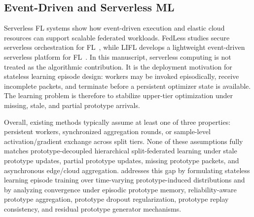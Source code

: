 \subsection{Event-Driven and Serverless ML}
Serverless FL systems show how event-driven execution and elastic cloud resources can support scalable federated workloads. FedLess studies secure serverless orchestration for FL~\cite{grafberger2021fedless}, while LIFL develops a lightweight event-driven serverless platform for FL~\cite{qi2024lifl}. In this manuscript, serverless computing is not treated as the algorithmic contribution. It is the deployment motivation for stateless learning episode design: workers may be invoked episodically, receive incomplete packets, and terminate before a persistent optimizer state is available. The learning problem is therefore to stabilize upper-tier optimization under missing, stale, and partial prototype arrivals.

Overall, existing methods typically assume at least one of three properties: persistent workers, synchronized aggregation rounds, or sample-level activation/gradient exchange across split tiers. None of these assumptions fully matches prototype-decoupled hierarchical split-federated learning under stale prototype updates, partial prototype updates, missing prototype packets, and asynchronous edge/cloud aggregation. \ehsfp addresses this gap by formulating stateless learning episode training over time-varying prototype-induced distributions and by analyzing convergence under episodic prototype memory, reliability-aware prototype aggregation, prototype dropout regularization, prototype replay consistency, and residual prototype generator mechanisms.
